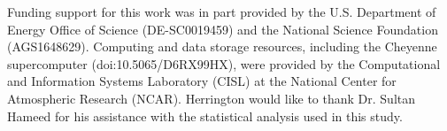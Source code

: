 \documentclass[times]{qjrms4}
\begin{document}

\ack 
Funding support for this work was in part provided by the U.S. Department of Energy Office of Science (DE-SC0019459) and the National Science Foundation (AGS1648629). Computing and data storage resources, including the Cheyenne supercomputer (doi:10.5065/D6RX99HX), were provided by the Computational and Information Systems Laboratory (CISL) at the National Center for Atmospheric Research (NCAR). Herrington would like to thank Dr. Sultan Hameed for his assistance with the statistical analysis used in this study.



\end{document}
